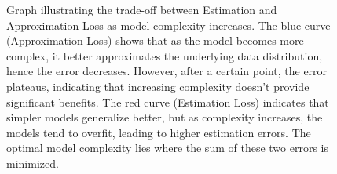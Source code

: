 \documentclass[11pt]{article}
\begin{document}
    \begin{figure}[h]
        \centering
        \caption{Graph illustrating the trade-off between Estimation and Approximation Loss as model complexity increases. The blue curve (Approximation Loss) shows that as the model becomes more complex, it better approximates the underlying data distribution, hence the error decreases. However, after a certain point, the error plateaus, indicating that increasing complexity doesn't provide significant benefits. The red curve (Estimation Loss) indicates that simpler models generalize better, but as complexity increases, the models tend to overfit, leading to higher estimation errors. The optimal model complexity lies where the sum of these two errors is minimized.}
        \label{fig:est-app}
    \end{figure}
\end{document}
